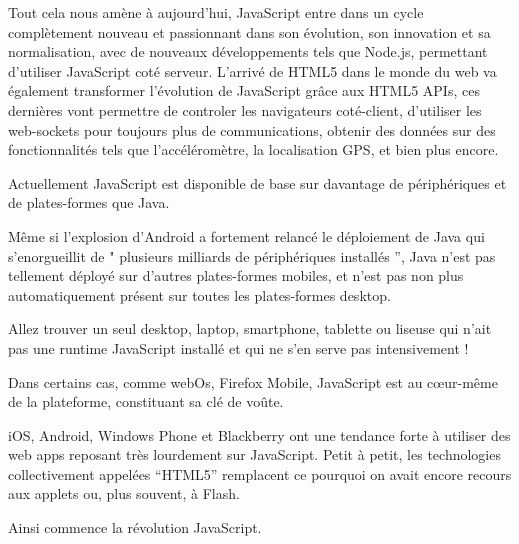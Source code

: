 Tout cela nous amène à aujourd’hui, JavaScript entre dans un cycle complètement nouveau et passionnant dans son évolution, son innovation et sa normalisation, avec de nouveaux développements tels que Node.js, permettant d’utiliser JavaScript coté serveur. L’arrivé de HTML5 dans le monde du web va également transformer l’évolution de JavaScript grâce aux HTML5 APIs, ces dernières vont permettre de controler les navigateurs coté-client, d'utiliser les web-sockets pour toujours plus de communications, obtenir des données sur des fonctionnalités tels que l'accéléromètre, la localisation GPS, et bien plus encore.

Actuellement JavaScript est disponible de base sur davantage de périphériques et de plates-formes que Java.

Même si l'explosion d’Android a fortement relancé le déploiement de Java qui s'enorgueillit de " plusieurs milliards de périphériques installés ”, Java n’est pas tellement déployé sur d’autres plates-formes mobiles, et n’est pas non plus automatiquement présent sur toutes les plates-formes desktop.

Allez trouver un seul desktop, laptop, smartphone, tablette ou liseuse qui n’ait pas une runtime JavaScript installé et qui ne s’en serve pas intensivement !

Dans certains cas, comme webOs, Firefox Mobile, JavaScript est au cœur-même de la plateforme, constituant sa clé de voûte.

iOS, Android, Windows Phone et Blackberry ont une tendance forte à utiliser des web apps reposant très lourdement sur JavaScript. Petit à petit, les technologies collectivement appelées “HTML5” remplacent ce pourquoi on avait encore recours aux applets ou, plus souvent, à Flash.

Ainsi commence la révolution JavaScript.
